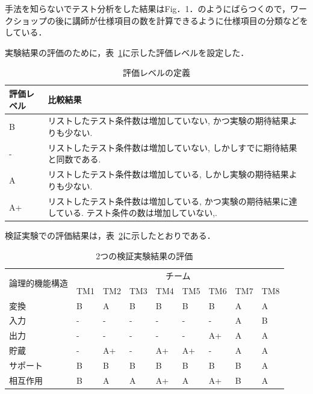 手法を知らないでテスト分析をした結果はFig．1．のようにばらつくので，ワークショップの後に講師が仕様項目の数を計算できるように仕様項目の分類などをしている．

実験結果の評価のために，表~\ref{tbl:D-3-tbl4}に示した評価レベルを設定した．
\begin{table}[htbp]
\footnotesize
  \centering
  \caption{評価レベルの定義}
    \begin{tabular}{|l|p{14em}|}
       \hline
    評価レベル & \multicolumn{1}{l|}{比較結果} \\
        \hline
     B    & リストしたテスト条件数は増加していない, かつ実験の期待結果よりも少ない.  \\
        \hline
    -     & リストしたテスト条件数は増加していない, しかしすでに期待結果と同数である.  \\
        \hline
    A     & リストしたテスト条件数は増加している, しかし実験の期待結果よりも少ない.   \\
       \hline
    A+    & リストしたテスト条件数は増加している, かつ実験の期待結果に達している. テスト条件の数は増加していない,.  \\
        \hline
    \end{tabular}%
  \label{tbl:D-3-tbl4}%
\end{table}%
検証実験での評価結果は，表~\ref{tbl:D-3-tbl5}に示したとおりである．

\begin{table}[htbp]
\footnotesize
  \centering
  \caption{2つの検証実験結果の評価}
    \begin{tabular}{|l|l|l|l|l|l|l|l|l|}
    \hline
    \multicolumn{1}{|c|}{\multirow{2}[4]{*}{論理的機能構造}} & \multicolumn{8}{c|}{チーム} \bigstrut\\
\cline{2-9}          & TM1   & TM2   & TM3   & TM4   & TM5   & TM6 & TM7 & TM8 \bigstrut\\
    \hline
    変換  & B     & A     & B     & B     & B     & B & A     & A\bigstrut\\
    \hline
    入力 &  -     &   -     &   -    &   -    &   -    & -     & A     & B   \bigstrut\\
    \hline
    出力 & -     & -     & -     & -     & -     & A+ & A     & A \bigstrut\\
    \hline
    貯蔵 & -     & A+    & -     & A+    & A+    & -& A     & A  \bigstrut\\
    \hline
    サポート & B     & B     & B     & B     & B     & B& B     & A \bigstrut[t]\\
    \hline
    相互作用  & B     & A     & A     & A+    & A     & A+& B     & A \bigstrut[b]\\
    \hline
    \end{tabular}%
  \label{tbl:D-3-tbl5}%
\end{table}%

